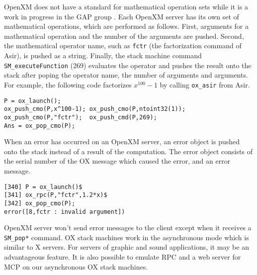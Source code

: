 OpenXM does not have a standard for mathematical operation sets
while it is a work in progress in the GAP group \cite{gap}.
Each OpenXM server has its own set of mathematical operations,
which are performed as follows.
First, arguments for a mathematical operation
and the number of the arguments are pushed.
Second, 
the mathematical operator name, 
such as {\tt fctr} (the factorization command of Asir),
is pushed as a string.
Finally, the stack machine command
{\tt SM\_executeFunction} (269) evaluates the operator and
pushes the result onto the stack
after poping the operator name, the number of arguments
and arguments.
For example, the following code factorizes $x^{100}-1$ by calling
{\tt ox\_asir} from Asir.
\begin{verbatim}
P = ox_launch(); 
ox_push_cmo(P,x^100-1); ox_push_cmo(P,ntoint32(1));
ox_push_cmo(P,"fctr");  ox_push_cmd(P,269); 
Ans = ox_pop_cmo(P);
\end{verbatim}

When an error has occurred on an OpenXM server,
an error object is pushed onto the stack 
instead of a result of the computation.
The error object consists of the serial number of the OX message
which caused the error, and an error message.
\begin{verbatim}
[340] P = ox_launch()$
[341] ox_rpc(P,"fctr",1.2*x)$
[342] ox_pop_cmo(P);
error([8,fctr : invalid argument])
\end{verbatim}

OpenXM server won't send error messages to the client
except when it receives a {\tt SM\_pop*} command.
OX stack machines work in the asynchronous mode which is similar 
to X servers.
For servers of graphic and sound applications, 
it may be an advantageous feature.
It is also possible to emulate RPC and a web server for MCP \cite{iamc} 
on our asynchronous OX stack machines.





